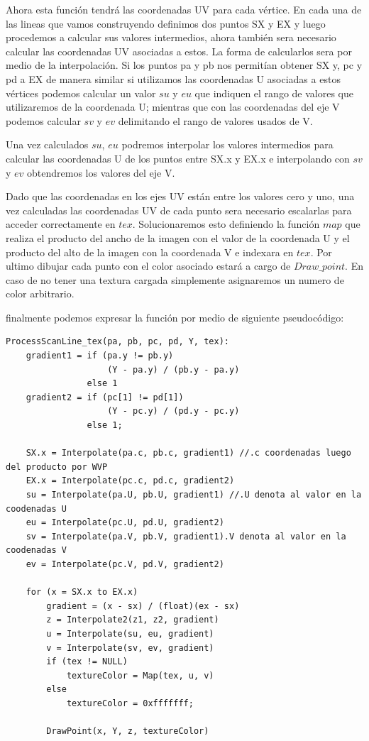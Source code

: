 \documentclass[a4paper]{article}
\newcounter{col}
\begin{document}
Ahora esta función tendrá las coordenadas UV para cada vértice. En cada una de las lineas que vamos construyendo definimos dos puntos SX y EX y luego procedemos a calcular sus valores intermedios, ahora también sera necesario calcular las coordenadas UV asociadas a estos. La forma de calcularlos sera por medio de la interpolación. Si los puntos pa y pb nos permitían obtener SX y, pc y pd a EX de manera similar si utilizamos las coordenadas U asociadas a estos vértices podemos calcular un valor $su$ y $eu$ que indiquen el rango de valores que utilizaremos de la coordenada U; mientras que con las coordenadas del eje V podemos calcular $sv$ y $ev$ delimitando el rango de valores usados de V.
\par Una vez calculados $su$, $eu$ podremos interpolar los valores intermedios para calcular las coordenadas U de los puntos entre SX.x y EX.x e interpolando con $sv$ y $ev$ obtendremos los valores del eje V.
\par Dado que las coordenadas en los ejes UV están entre los valores cero y uno, una vez calculadas las coordenadas UV de cada punto sera necesario escalarlas para acceder correctamente en $tex$. Solucionaremos esto definiendo la función $map$ que realiza el producto del ancho de la imagen con el valor de la coordenada U y el producto del alto de la imagen con la coordenada V e indexara en $tex$.
Por ultimo dibujar cada punto con el color asociado estará a cargo de $Draw\_point$. En caso de no tener una textura cargada simplemente asignaremos un numero de color arbitrario.  
\par finalmente podemos expresar la función por medio de siguiente pseudocódigo: 




\begin{verbatim}
ProcessScanLine_tex(pa, pb, pc, pd, Y, tex):
    gradient1 = if (pa.y != pb.y) 
                    (Y - pa.y) / (pb.y - pa.y)
                else 1                          
    gradient2 = if (pc[1] != pd[1]) 
                    (Y - pc.y) / (pd.y - pc.y)
                else 1;
            
    SX.x = Interpolate(pa.c, pb.c, gradient1) //.c coordenadas luego del producto por WVP
    EX.x = Interpolate(pc.c, pd.c, gradient2)
    su = Interpolate(pa.U, pb.U, gradient1) //.U denota al valor en la coodenadas U
    eu = Interpolate(pc.U, pd.U, gradient2)
    sv = Interpolate(pa.V, pb.V, gradient1).V denota al valor en la coodenadas V
    ev = Interpolate(pc.V, pd.V, gradient2)
    
    for (x = SX.x to EX.x)
        gradient = (x - sx) / (float)(ex - sx)
        z = Interpolate2(z1, z2, gradient)
        u = Interpolate(su, eu, gradient)
        v = Interpolate(sv, ev, gradient)
        if (tex != NULL)
            textureColor = Map(tex, u, v)
        else
            textureColor = 0xfffffff;
    
        DrawPoint(x, Y, z, textureColor)
\end{verbatim}
\end{document}
